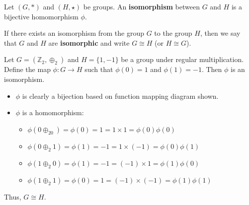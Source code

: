 \begin{definition}
    Let $(G, \ast)$ and $(H, \star)$ be groups. An \textbf{isomorphism} between $G$ and $H$ is a bijective homomorphism $\phi$.
\end{definition}

If there exists an isomorphism from the group $G$ to the group $H$, then we say that $G$ and $H$ are \textbf{isomorphic} and write $G \cong H$ (or $H \cong G$).

\begin{example}
    Let $G = (\mathbb{Z}_2, \oplus_2)$ and $H = \{1, -1\}$ be a group under regular multiplication. Define the map $\phi: G \to H$ such that $\phi(0) = 1$ and $\phi(1) = -1$. Then $\phi$ is an isomorphism.
    
    \newpage
    
    \begin{itemize}
        \item $\phi$ is clearly a bijection based on function mapping diagram shown.
        \begin{figure}[h]
            \centering
        \end{figure}
        \item $\phi$ is a homomorphism:\begin{itemize}
            \item $\phi(0\oplus_20) = \phi(0) = 1 = 1 \times 1 = \phi(0)\phi(0)$
            \item $\phi(0 \oplus_2 1) = \phi(1) = -1 = 1 \times (-1) = \phi(0)\phi(1)$
            \item $\phi(1 \oplus_2 0) = \phi(1) = -1 = (-1) \times 1 = \phi(1)\phi(0)$
            \item $\phi(1 \oplus_2 1) = \phi(0) = 1 = (-1) \times (-1) = \phi(1)\phi(1)$
        \end{itemize}
    \end{itemize}
    Thus, $G \cong H$.
\end{example}

